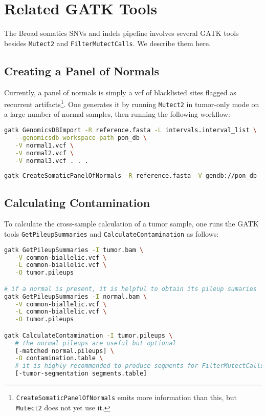 \documentclass[nofootinbib,amssymb,amsmath]{revtex4}
\newcommand{\code}[1]{\texttt{#1}}
\begin{document}
\section{Related GATK Tools}
The Broad somatics SNVs and indels pipeline involves several GATK tools besides \code{Mutect2} and \code{FilterMutectCalls}.  We describe them here.

\subsection{Creating a Panel of Normals}
Currently, a panel of normals is simply a vcf of blacklisted sites flagged as recurrent artifacts\footnote{\code{CreateSomaticPanelOfNormals} emits more information than this, but \code{Mutect2} does not yet use it.}.  One generates it by running \code{Mutect2} in tumor-only mode on a large number of normal samples, then running the following workflow:

\begin{lstlisting}[language=bash,caption={CreateSomaticPanelOfNormals command}, label={cmd-mutect2}]
gatk GenomicsDBImport -R reference.fasta -L intervals.interval_list \
   --genomicsdb-workspace-path pon_db \
   -V normal1.vcf \
   -V normal2.vcf \
   -V normal3.vcf . . .
   
gatk CreateSomaticPanelOfNormals -R reference.fasta -V gendb://pon_db -O pon.vcf
\end{lstlisting}



\subsection{Calculating Contamination}
To calculate the cross-sample calculation of a tumor sample, one runs the GATK tools \code{GetPileupSummaries} and \code{CalculateContamination} as follows:

\begin{lstlisting}[language=bash,caption={CalculateContamination command}, label={cmd-mutect2}]
gatk GetPileupSummaries -I tumor.bam \
   -V common-biallelic.vcf \
   -L common-biallelic.vcf \
   -O tumor.pileups

# if a normal is present, it is helpful to obtain its pileup sumaries
gatk GetPileupSummaries -I normal.bam \
   -V common-biallelic.vcf \
   -L common-biallelic.vcf \
   -O tumor.pileups

gatk CalculateContamination -I tumor.pileups \
   # the normal pileups are useful but optional
   [-matched normal.pileups] \
   -O contamination.table \
   # it is highly recommended to produce segments for FilterMutectCalls
   [-tumor-segmentation segments.table]
\end{lstlisting}
\end{document}
